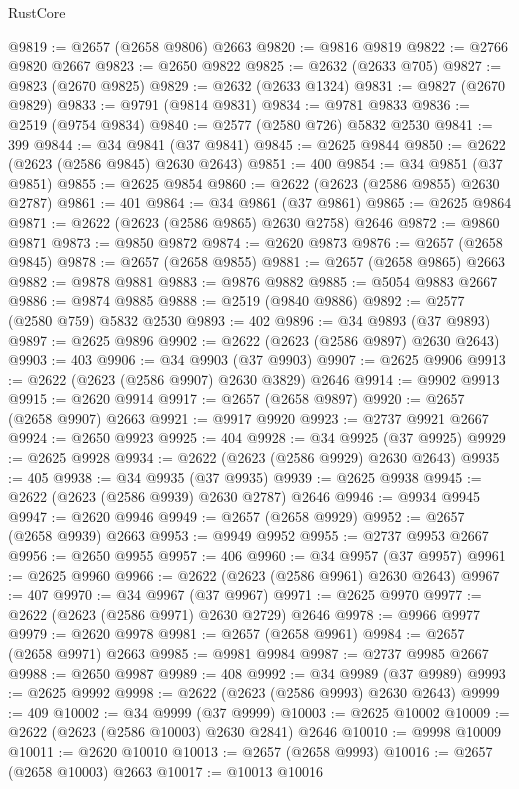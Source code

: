 \begin{lexlean}{RustCore}
\begin{coremodule}
@9819 := @2657 (@2658 @9806) @2663
@9820 := @9816 @9819
@9822 := @2766 @9820 @2667
@9823 := @2650 @9822
@9825 := @2632 (@2633 @705)
@9827 := @9823 (@2670 @9825)
@9829 := @2632 (@2633 @1324)
@9831 := @9827 (@2670 @9829)
@9833 := @9791 (@9814 @9831)
@9834 := @9781 @9833
@9836 := @2519 (@9754 @9834)
@9840 := @2577 (@2580 @726) @5832 @2530
@9841 := 399
@9844 := @34 @9841 (@37 @9841)
@9845 := @2625 @9844
@9850 := @2622 (@2623 (@2586 @9845) @2630 @2643)
@9851 := 400
@9854 := @34 @9851 (@37 @9851)
@9855 := @2625 @9854
@9860 := @2622 (@2623 (@2586 @9855) @2630 @2787)
@9861 := 401
@9864 := @34 @9861 (@37 @9861)
@9865 := @2625 @9864
@9871 := @2622 (@2623 (@2586 @9865) @2630 @2758) @2646
@9872 := @9860 @9871
@9873 := @9850 @9872
@9874 := @2620 @9873
@9876 := @2657 (@2658 @9845)
@9878 := @2657 (@2658 @9855)
@9881 := @2657 (@2658 @9865) @2663
@9882 := @9878 @9881
@9883 := @9876 @9882
@9885 := @5054 @9883 @2667
@9886 := @9874 @9885
@9888 := @2519 (@9840 @9886)
@9892 := @2577 (@2580 @759) @5832 @2530
@9893 := 402
@9896 := @34 @9893 (@37 @9893)
@9897 := @2625 @9896
@9902 := @2622 (@2623 (@2586 @9897) @2630 @2643)
@9903 := 403
@9906 := @34 @9903 (@37 @9903)
@9907 := @2625 @9906
@9913 := @2622 (@2623 (@2586 @9907) @2630 @3829) @2646
@9914 := @9902 @9913
@9915 := @2620 @9914
@9917 := @2657 (@2658 @9897)
@9920 := @2657 (@2658 @9907) @2663
@9921 := @9917 @9920
@9923 := @2737 @9921 @2667
@9924 := @2650 @9923
@9925 := 404
@9928 := @34 @9925 (@37 @9925)
@9929 := @2625 @9928
@9934 := @2622 (@2623 (@2586 @9929) @2630 @2643)
@9935 := 405
@9938 := @34 @9935 (@37 @9935)
@9939 := @2625 @9938
@9945 := @2622 (@2623 (@2586 @9939) @2630 @2787) @2646
@9946 := @9934 @9945
@9947 := @2620 @9946
@9949 := @2657 (@2658 @9929)
@9952 := @2657 (@2658 @9939) @2663
@9953 := @9949 @9952
@9955 := @2737 @9953 @2667
@9956 := @2650 @9955
@9957 := 406
@9960 := @34 @9957 (@37 @9957)
@9961 := @2625 @9960
@9966 := @2622 (@2623 (@2586 @9961) @2630 @2643)
@9967 := 407
@9970 := @34 @9967 (@37 @9967)
@9971 := @2625 @9970
@9977 := @2622 (@2623 (@2586 @9971) @2630 @2729) @2646
@9978 := @9966 @9977
@9979 := @2620 @9978
@9981 := @2657 (@2658 @9961)
@9984 := @2657 (@2658 @9971) @2663
@9985 := @9981 @9984
@9987 := @2737 @9985 @2667
@9988 := @2650 @9987
@9989 := 408
@9992 := @34 @9989 (@37 @9989)
@9993 := @2625 @9992
@9998 := @2622 (@2623 (@2586 @9993) @2630 @2643)
@9999 := 409
@10002 := @34 @9999 (@37 @9999)
@10003 := @2625 @10002
@10009 := @2622 (@2623 (@2586 @10003) @2630 @2841) @2646
@10010 := @9998 @10009
@10011 := @2620 @10010
@10013 := @2657 (@2658 @9993)
@10016 := @2657 (@2658 @10003) @2663
@10017 := @10013 @10016

\end{coremodule}
\end{lexlean}
